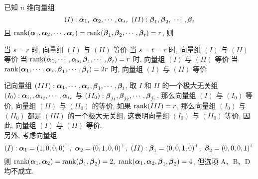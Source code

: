 \begin{example}
    已知 $n$ 维向量组 $$(I):\vb*{\alpha}_1,~\vb*{\alpha}_2,\cdots,\vb*{\alpha}_s,~(II): \vb*{\beta}_1,\vb*{\beta}_2,~\cdots,\vb*{\beta}_t$$
    且 $\rank(\vb*{\alpha}_1,\vb*{\alpha}_2,\cdots,\vb*{\alpha}_s)=\rank(\vb*{\beta}_1,\vb*{\beta}_2,\cdots,\vb*{\beta}_t)=r$, 则
    \begin{tasks}
        \task 当 $s=r$ 时, 向量组 $(I)$ 与 $(II)$ 等价
        \task 当 $s=t=r$ 时, 向量组 $(I)$ 与 $(II)$ 等价
        \task 当 $\rank(\vb*{\alpha}_1,\cdots,\vb*{\alpha}_s,\vb*{\beta}_1,\cdots,\vb*{\beta}_t)=r$ 时, 向量组 $(I)$ 与 $(II)$ 等价
        \task 当 $\rank(\vb*{\alpha}_1,\cdots,\vb*{\alpha}_s,\vb*{\beta}_1,\cdots,\vb*{\beta}_t)=2r$ 时, 向量组 $(I)$ 与 $(II)$ 等价
    \end{tasks}
\end{example}
\begin{solution}
    记向量组 $(III):\vb*{\alpha}_1,\cdots,\vb*{\alpha}_s,\vb*{\beta}_1,\cdots,\vb*{\beta}_t$, 取 ${I}$ 和 ${II}$ 的一个极大无关组 $(I_0): \vb*{\alpha}_{i_1},\vb*{\alpha}_{i_2},\cdots,\vb*{\alpha}_{i_r}$ 与 $(II_0):\vb*{\beta}_{j_1},\vb*{\beta}_{j_2},\cdots,\vb*{\beta}_{j_r}$,
    那么向量组 $(I)$ 与 $(I_0)$ 等价, 向量组 $(II)$ 与 $(II_0)$ 的等价, 如果 $\rank(III)=r$, 那么向量组 $(I_0)$ 与 $(II_0)$ 都是 $(III)$ 的一个极大无关组, 这表明向量组 $(I_0)$ 与 $(II_0)$ 等价, 因此, 向量组 $(I)$ 与 $(II)$ 等价.\\
    另外, 考虑向量组 $$(I):\vb*{\alpha}_1=(1,0,0,0)^\top,~\vb*{\alpha}_2=(0,1,0,0)^\top,~(II):\vb*{\beta}_1=(0,0,1,0)^\top,~\vb*{\beta}_2=(0,0,0,1)^\top$$
    则 $\rank(\vb*{\alpha}_1,\vb*{\alpha}_2)=\rank(\vb*{\beta}_1,\vb*{\beta}_2)=2,~\rank(\vb*{\alpha}_1,\vb*{\alpha}_2,\vb*{\beta}_1,\vb*{\beta}_2)=4$, 但选项 A、B、D 均不成立.
\end{solution}

